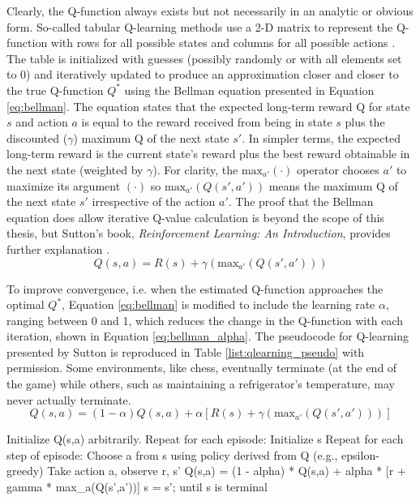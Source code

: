 Clearly, the Q-function always exists but not necessarily in an analytic or obvious form. So-called tabular Q-learning methods use a 2-D matrix to represent the Q-function with rows for all possible states and columns for all possible actions \cite{mccullock}. The table is initialized with guesses (possibly randomly or with all elements set to 0) and iteratively updated to produce an approximation closer and closer to the true Q-function $Q^*$ using the Bellman equation presented in Equation \ref{eq:bellman}. The equation states that the expected long-term reward Q for state $s$ and action $a$ is equal to the reward received from being in state $s$ plus the discounted ($\gamma$) maximum Q of the next state $s'$. In simpler terms, the expected long-term reward is the current state's reward plus the best reward obtainable in the next state (weighted by $\gamma$). For clarity, the $\text{max}_{a'}(\cdot)$ operator chooses $a'$ to maximize its argument $(\cdot)$ so $\text{max}_{a'}(Q(s',a'))$ means the maximum Q of the next state $s'$ irrespective of the action $a'$. The proof that the Bellman equation does allow iterative Q-value calculation is beyond the scope of this thesis, but Sutton's book, \textit{Reinforcement Learning: An Introduction}, provides further explanation \cite{sutton_2017}.
\begin{equation}
	\label{eq:bellman}
	Q(s,a)=R(s) + \gamma (\text{max}_{a'}(Q(s',a')))
\end{equation}

To improve convergence, i.e. when the estimated Q-function approaches the optimal $Q^*$, Equation \ref{eq:bellman} is modified to include the learning rate $\alpha$, ranging between 0 and 1, which reduces the change in the Q-function with each iteration, shown in Equation \ref{eq:bellman_alpha}. The pseudocode for Q-learning presented by Sutton is reproduced in Table \ref{list:qlearning_pseudo} with permission. Some environments, like chess, eventually terminate (at the end of the game) while others, such as maintaining a refrigerator's temperature, may never actually terminate.
\begin{equation}
	\label{eq:bellman_alpha}
	Q(s,a)=(1-\alpha)Q(s,a) + \alpha[R(s) + \gamma (\text{max}_{a'}(Q(s',a')))]
\end{equation}
\begin{clisting}[caption={Q-Learning Pseudocode},label={list:qlearning_pseudo}]
Initialize Q(s,a) arbitrarily. 
Repeat for each episode: 
	Initialize s
	Repeat for each step of episode:
		Choose a from s using policy derived from Q (e.g., epsilon-greedy)
		Take action a, observe r, s'
		Q(s,a) = (1 - alpha) * Q(s,a) + alpha * [r + gamma * max_a(Q(s',a'))]
		s = s';
	until s is terminal 
\end{clisting}

